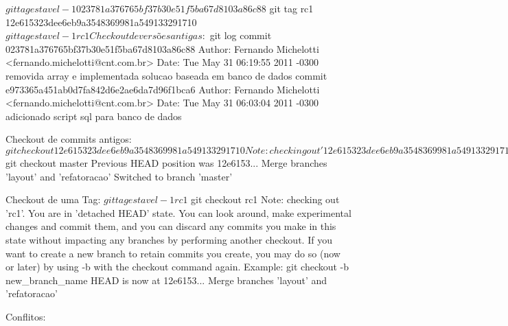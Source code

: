 \documentclass{beamer}
\begin{document}
$ git tag estavel-1 023781a376765bf37b30e51f5ba67d8103a86c88
$ git tag rc1 12e615323dee6eb9a3548369981a549133291710
$ git tag
estavel-1
rc1

Checkout de versões antigas:
$ git log
commit 023781a376765bf37b30e51f5ba67d8103a86c88
Author: Fernando Michelotti <fernando.michelotti@cnt.com.br>
Date: Tue May 31 06:19:55 2011 -0300
removida array e implementada solucao baseada em banco de dados
commit e973365a451ab0d7fa842d6e2ae6da7d96f1bca6
Author: Fernando Michelotti <fernando.michelotti@cnt.com.br>
Date: Tue May 31 06:03:04 2011 -0300
adicionado script sql para banco de dados

Checkout de commits antigos:
$ git checkout 12e615323dee6eb9a3548369981a549133291710
Note: checking out '12e615323dee6eb9a3548369981a549133291710'.
You are in 'detached HEAD' state. You can look around, make experimental
changes and commit them, and you can discard any commits you make in this
state without impacting any branches by performing another checkout.
If you want to create a new branch to retain commits you create, you may
do so (now or later) by using -b with the checkout command again. Example:
git checkout -b new_branch_name
HEAD is now at 12e6153... Merge branches 'layout' and 'refatoracao'
$ git checkout master
Previous HEAD position was 12e6153... Merge branches 'layout' and 'refatoracao'
Switched to branch 'master'

Checkout de uma Tag:
$ git tag
estavel-1
rc1
$ git checkout rc1
Note: checking out 'rc1'.
You are in 'detached HEAD' state. You can look around, make experimental
changes and commit them, and you can discard any commits you make in this
state without impacting any branches by performing another checkout.
If you want to create a new branch to retain commits you create, you may
do so (now or later) by using -b with the checkout command again. Example:
git checkout -b new_branch_name
HEAD is now at 12e6153... Merge branches 'layout' and 'refatoracao'

Conflitos:
\end{document}
